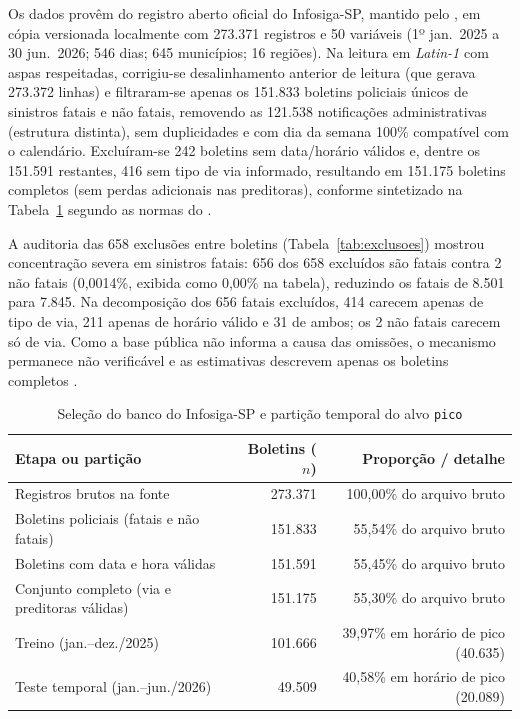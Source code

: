 \documentclass[
  article,
  12pt,
  oneside,
  a4paper,
  section=TITLE,
  english,
  brazil
]{abntex2}\usepackage[]{graphicx}\usepackage[]{xcolor}
\begin{document}
Os dados provêm do registro aberto oficial do Infosiga-SP, mantido pelo \textcite{infosiga2026}, em cópia versionada localmente com 273.371 registros e 50 variáveis (1º jan.\ 2025 a 30 jun.\ 2026; 546 dias; 645 municípios; 16 regiões). Na leitura em \textit{Latin-1} com aspas respeitadas, corrigiu-se desalinhamento anterior de leitura (que gerava 273.372 linhas) e filtraram-se apenas os 151.833 boletins policiais únicos de sinistros fatais e não fatais, removendo as 121.538 notificações administrativas (estrutura distinta), sem duplicidades e com dia da semana 100\% compatível com o calendário. Excluíram-se 242 boletins sem data/horário válidos e, dentre os 151.591 restantes, 416 sem tipo de via informado, resultando em 151.175 boletins completos (sem perdas adicionais nas preditoras), conforme sintetizado na Tabela~\ref{tab:coorte} segundo as normas do \textcite{ibge1993}.

A auditoria das 658 exclusões entre boletins (Tabela~\ref{tab:exclusoes}) mostrou concentração severa em sinistros fatais: 656 dos 658 excluídos são fatais contra 2 não fatais (0,0014\%, exibida como 0,00\% na tabela), reduzindo os fatais de 8.501 para 7.845. Na decomposição dos 656 fatais excluídos, 414 carecem apenas de tipo de via, 211 apenas de horário válido e 31 de ambos; os 2 não fatais carecem só de via. Como a base pública não informa a causa das omissões, o mecanismo permanece não verificável e as estimativas descrevem apenas os boletins completos \parencite{kapoor2024}.

\begin{table}[htbp]
  \centering
  \SingleSpacing
  \caption{Seleção do banco do Infosiga-SP e partição temporal do alvo \texttt{pico}}
  \label{tab:coorte}
  \footnotesize
  \renewcommand{\arraystretch}{0.92}
\begin{tabular}{lrr}
\toprule
Etapa ou partição & Boletins ($n$) & Proporção / detalhe \\
\midrule
Registros brutos na fonte & 273.371 & 100,00\% do arquivo bruto \\
Boletins policiais (fatais e não fatais) & 151.833 & 55,54\% do arquivo bruto \\
Boletins com data e hora válidas & 151.591 & 55,45\% do arquivo bruto \\
Conjunto completo (via e preditoras válidas) & 151.175 & 55,30\% do arquivo bruto \\
\midrule
Treino (jan.--dez./2025) & 101.666 & 39,97\% em horário de pico (40.635) \\
Teste temporal (jan.--jun./2026) & 49.509 & 40,58\% em horário de pico (20.089) \\
\bottomrule
\end{tabular}

\end{table}
\end{document}
